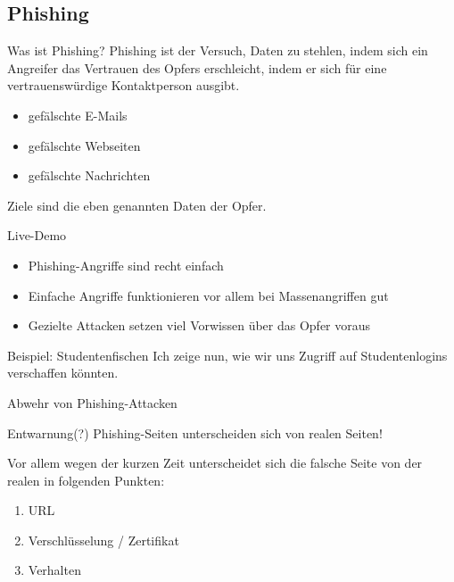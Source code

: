 \documentclass[hyperref={colorlinks,linkcolor=white}, utf8]{beamer}
\begin{document}
	\subsection{Phishing}
	\begin{frame}
		\begin{block}{Was ist Phishing?}
			Phishing ist der Versuch, Daten zu stehlen, indem sich ein Angreifer das Vertrauen des Opfers erschleicht, indem er sich für eine vertrauenswürdige Kontaktperson ausgibt.
		\end{block}
		
		\begin{itemize}
			\item gefälschte E-Mails
			\item gefälschte Webseiten
			\item gefälschte Nachrichten
		\end{itemize}
	
		\alert{Ziele sind die eben genannten Daten der Opfer.}		
	\end{frame}

	\begin{frame}{Live-Demo}
		\begin{itemize}
			\item Phishing-Angriffe sind recht einfach
			\item Einfache Angriffe funktionieren vor allem bei Massenangriffen gut
			\item Gezielte Attacken setzen viel Vorwissen über das Opfer voraus
		\end{itemize}
	
		\begin{exampleblock}{Beispiel: Studentenfischen}
			Ich zeige nun, wie wir uns Zugriff auf Studentenlogins verschaffen könnten.
		\end{exampleblock}
	\end{frame}
	
	\begin{frame}{Abwehr von Phishing-Attacken}
		\begin{alertblock}{Entwarnung(?)}
			Phishing-Seiten unterscheiden sich von realen Seiten!
		\end{alertblock}
	
		Vor allem wegen der kurzen Zeit unterscheidet sich die falsche Seite von der realen in folgenden Punkten:
		\begin{enumerate}
			\item URL
			\item Verschlüsselung / Zertifikat
			\item Verhalten
		\end{enumerate}		
	\end{frame}
	
\end{document}
